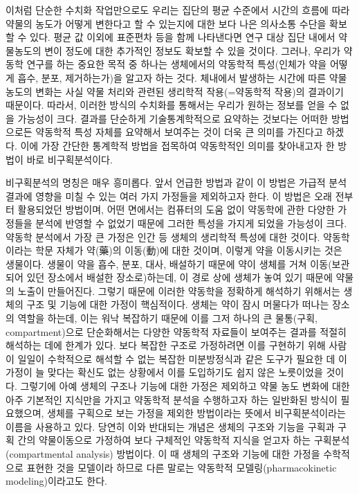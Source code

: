 \documentclass[
  11pt,
  krantz2, a4paper, twoside]{krantz}
\theoremstyle{definition}
\theoremstyle{definition}
\theoremstyle{definition}
\theoremstyle{definition}
\theoremstyle{remark}
\begin{document}
이처럼 단순한 수치화 작업만으로도 우리는 집단의 평균 수준에서 시간의 흐름에 따라 약물의 농도가 어떻게 변한다고 할 수 있는지에 대한 보다 나은 의사소통 수단을 확보할 수 있다.
평균 값 이외에 표준편차 등을 함께 나타낸다면 연구 대상 집단 내에서 약물농도의 변이 정도에 대한 추가적인 정보도 확보할 수 있을 것이다.
그러나, 우리가 약동학 연구를 하는 중요한 목적 중 하나는 생체에서의 약동학적 특성(인체가 약을 어떻게 흡수, 분포, 제거하는가)을 알고자 하는 것다.
체내에서 발생하는 시간에 따른 약물농도의 변화는 사실 약물 처리와 관련된 생리학적 작용(=약동학적 작용)의 결과이기 때문이다.
따라서, 이러한 방식의 수치화를 통해서는 우리가 원하는 정보를 얻을 수 없을 가능성이 크다. 
결과를 단순하게 기술통계학적으로 요약하는 것보다는 어떠한 방법으로든 약동학적 특성 자체를 요약해서 보여주는 것이 더욱 큰 의미를 가진다고 하겠다. 
이에 가장 간단한 통계학적 방법을 접목하여 약동학적인 의미를 찾아내고자 한 방법이 바로 비구획분석이다.

비구획분석의 명칭은 매우 흥미롭다.
앞서 언급한 방법과 같이 이 방법은 가급적 분석결과에 영향을 미칠 수 있는 여러 가지 가정들을 제외하고자 한다.
이 방법은 오래 전부터 활용되었던 방법이며, 어떤 면에서는 컴퓨터의 도움 없이 약동학에 관한 다양한 가정들을 분석에 반영할 수 없었기 때문에 그러한 특성을 가지게 되었을 가능성이 크다.
약동학 분석에서 가장 큰 가정은 인간 등 생체의 생리학적 특성에 대한 것이다. 
약동학이라는 학문 자체가 약(藥)의 이동(動)에 대한 것이며, 이렇게 약을 이동시키는 것은 생물이다. 
생물이 약을 흡수, 분포, 대사, 배설하기 때문에 약이 생체를 거쳐 이동(보관되어 있던 장소에서 배설한 장소로)하는데, 이 경로 상에 생체가 놓여 있기 때문에 약물의 노출이 만들어진다.
그렇기 때문에 이러한 약동학을 정확하게 해석하기 위해서는 생체의 구조 및 기능에 대한 가정이 핵심적이다. 
생체는 약이 잠시 머물다가 떠나는 장소의 역할을 하는데, 이는 워낙 복잡하기 때문에 이를 그저 하나의 큰 물통(구획, compartment)으로 단순화해서는 다양한 약동학적 자료들이 보여주는 결과를 적절히 해석하는 데에 한계가 있다. 
보다 복잡한 구조로 가정하려면 이를 구현하기 위해 사람이 일일이 수학적으로 해석할 수 없는 복잡한 미분방정식과 같은 도구가 필요한 데 이 가정이 늘 맞다는 확신도 없는 상황에서 이를 도입하기도 쉽지 않은 노릇이었을 것이다.
그렇기에 아예 생체의 구조나 기능에 대한 가정은 제외하고 약물 농도 변화에 대한 아주 기본적인 지식만을 가지고 약동학적 분석을 수행하고자 하는 일반화된 방식이 필요했으며, 생체를 구획으로 보는 가정을 제외한 방법이라는 뜻에서 비구획분석이라는 이름을 사용하고 있다. 
당연히 이와 반대되는 개념은 생체의 구조와 기능을 구획과 구획 간의 약물이동으로 가정하여 보다 구체적인 약동학적 지식을 얻고자 하는 구획분석(compartmental analysis) 방법이다.
이 때 생체의 구조와 기능에 대한 가정을 수학적으로 표현한 것을 모델이라 하므로 다른 말로는 약동학적 모델링(pharmacokinetic modeling)이라고도 한다.
\end{document}
